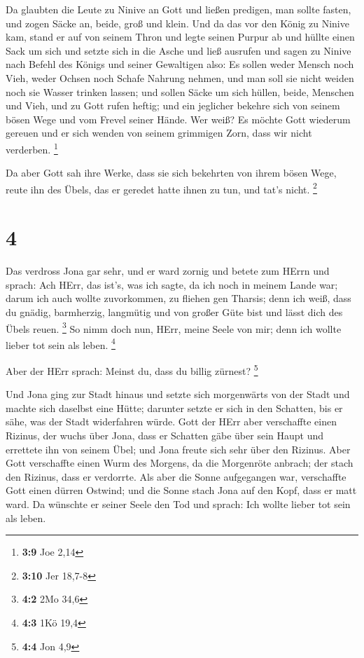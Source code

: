  Da glaubten die Leute zu Ninive an Gott und ließen
predigen, man sollte fasten, und zogen Säcke an, beide, groß und klein.
 Und da das vor den König zu Ninive kam, stand er auf von
seinem Thron und legte seinen Purpur ab und hüllte einen Sack um sich
und setzte sich in die Asche  und ließ ausrufen und sagen zu
Ninive nach Befehl des Königs und seiner Gewaltigen also: Es sollen
weder Mensch noch Vieh, weder Ochsen noch Schafe Nahrung nehmen, und man
soll sie nicht weiden noch sie Wasser trinken lassen;  und
sollen Säcke um sich hüllen, beide, Menschen und Vieh, und zu Gott rufen
heftig; und ein jeglicher bekehre sich von seinem bösen Wege und vom
Frevel seiner Hände.  Wer weiß? Es möchte Gott wiederum
gereuen und er sich wenden von seinem grimmigen Zorn, dass wir nicht
verderben. \footnote{\textbf{3:9} Joe 2,14}

 Da aber Gott sah ihre Werke, dass sie sich bekehrten von
ihrem bösen Wege, reute ihn des Übels, das er geredet hatte ihnen zu
tun, und tat's nicht. \footnote{\textbf{3:10} Jer 18,7-8}

\hypertarget{section-1}{%
\section{4}\label{section-1}}

 Das verdross Jona gar sehr, und er ward zornig 
und betete zum HErrn und sprach: Ach HErr, das ist's, was ich sagte, da
ich noch in meinem Lande war; darum ich auch wollte zuvorkommen, zu
fliehen gen Tharsis; denn ich weiß, dass du gnädig, barmherzig,
langmütig und von großer Güte bist und lässt dich des Übels reuen.
\footnote{\textbf{4:2} 2Mo 34,6}  So nimm doch nun, HErr,
meine Seele von mir; denn ich wollte lieber tot sein als leben.
\footnote{\textbf{4:3} 1Kö 19,4}

 Aber der HErr sprach: Meinst du, dass du billig zürnest?
\footnote{\textbf{4:4} Jon 4,9}

 Und Jona ging zur Stadt hinaus und setzte sich morgenwärts
von der Stadt und machte sich daselbst eine Hütte; darunter setzte er
sich in den Schatten, bis er sähe, was der Stadt widerfahren würde.
 Gott der HErr aber verschaffte einen Rizinus, der wuchs
über Jona, dass er Schatten gäbe über sein Haupt und errettete ihn von
seinem Übel; und Jona freute sich sehr über den Rizinus. 
Aber Gott verschaffte einen Wurm des Morgens, da die Morgenröte anbrach;
der stach den Rizinus, dass er verdorrte.  Als aber die
Sonne aufgegangen war, verschaffte Gott einen dürren Ostwind; und die
Sonne stach Jona auf den Kopf, dass er matt ward. Da wünschte er seiner
Seele den Tod und sprach: Ich wollte lieber tot sein als leben.


